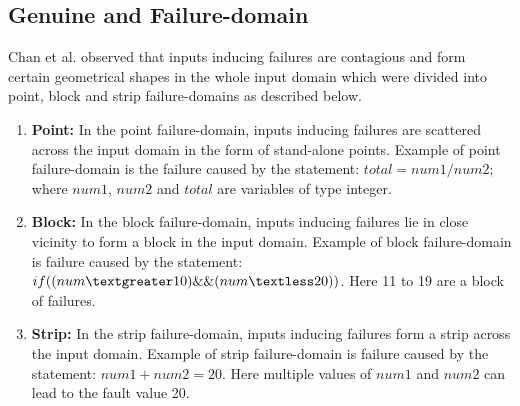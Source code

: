 \subsection{Genuine and Failure-domain} \label{sec:failuredomains_2}
\label{sec:genuineandfailuredomain}
Chan et al. \cite{chan1996proportional} observed that inputs inducing failures are contagious and form certain geometrical shapes in the whole input domain which were divided into point, block and strip failure-domains as described below.

\begin{enumerate}
\item {\bf Point:} In the point failure-domain, inputs inducing failures are scattered across the input domain in the form of stand-alone points. Example of point failure-domain is the failure caused by the statement: $total = num1/num2;$ where $num1$, $num2$ and $total$ are variables of type integer.
\item {\bf Block:} In the block failure-domain, inputs inducing failures lie in close vicinity to form a block in the input domain. Example of block failure-domain is failure caused by the statement: $if ( (num \textgreater 10) \&\& (num \textless 20) )$. Here 11 to 19 are a block of failures.
\item {\bf Strip:} In the strip failure-domain, inputs inducing failures form a strip across the input domain. Example of strip failure-domain is failure caused by the statement: $num1 + num2 = 20$. Here multiple values of $num1$ and $num2$ can lead to the fault value 20. 
\end{enumerate}

